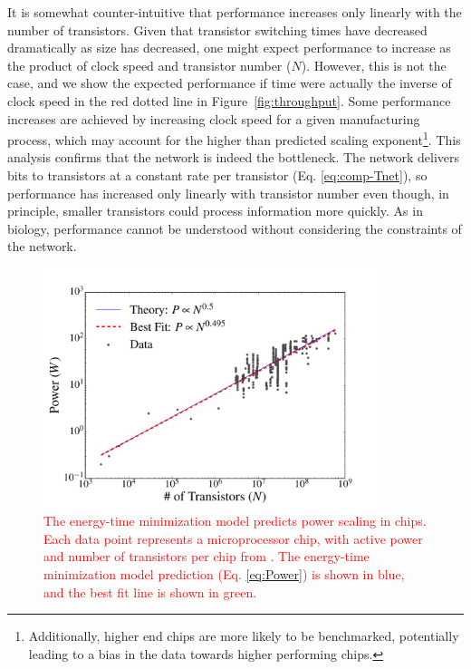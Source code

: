 \documentclass[12pt]{article}
\newcommand{\red}[1]{\textcolor{red}{#1}}
\begin{document}
It is somewhat counter-intuitive that
performance increases only linearly with the number of transistors.
Given that transistor switching times have decreased
dramatically as size has decreased, one might expect performance to increase as
the product of clock speed and transistor number ($N$).  However, this
is not the case, and we show
the expected performance if time were actually the inverse of clock
speed in the red dotted line in Figure~\ref{fig:throughput}. Some performance
increases are achieved by increasing clock speed for a given manufacturing
process, which may account for the higher than predicted scaling
exponent\footnote{Additionally, higher end chips are more likely to be
benchmarked, potentially leading to a bias in the data towards higher
performing chips.}. This analysis confirms that the network is indeed the
bottleneck. The network delivers bits to transistors at a constant rate per
transistor (Eq. \ref{eq:comp-Tnet}), so performance has increased only linearly
with transistor number even though, in principle, smaller transistors could process
information more quickly.  As in biology, performance cannot be understood
without considering the constraints of the network.


\begin{figure}[!h]
\centering
\includegraphics[height=70mm]{Figures/ChipsPowerScaling.pdf}
\caption{\red{The energy-time minimization model predicts power
scaling in chips. Each data point represents a microprocessor chip, with active power and number of transistors per chip from \cite{moses08}.  The energy-time minimization model
prediction (Eq. \ref{eq:Power}) is shown in blue, and the best fit line is shown in green.}}
\label{fig:power}
\end{figure}
\end{document}
